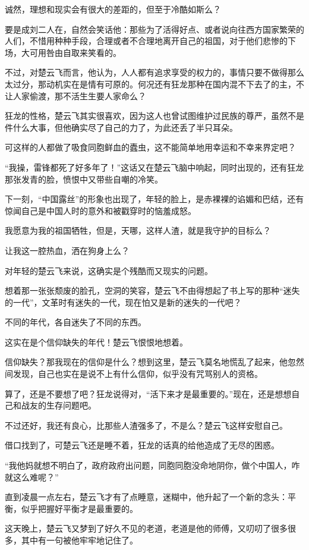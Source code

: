 诚然，理想和现实会有很大的差距的，但至于冷酷如斯么？

要是成刘二人在，自然会笑话他：那些为了活得好点、或者说向往西方国家繁荣的人们，不惜用种种手段，合理或者不合理地离开自己的祖国，对于他们悲惨的下场，大可用咎由自取来笑看的。

不过，对楚云飞而言，他认为，人人都有追求享受的权力的，事情只要不做得那么太过分，那动机实在是情有可原的。何况还有狂龙那种在国内混不下去了的主，不让人家偷渡，那不活生生要人家命么？

狂龙的性格，楚云飞其实很喜欢，因为这人也曾试图维护过民族的尊严，虽然不是件什么大事，但他确实尽了自己的力了，为此还丢了半只耳朵。

可这样的人都做了吸食同胞鲜血的蠹虫，这不能简单地用幸运和不幸来界定吧？

“我操，雷锋都死了好多年了！”这话又在楚云飞脑中响起，同时出现的，还有狂龙那张发青的脸，愤恨中又带些自嘲的冷笑。

下一刻，“中国露丝”的形象也出现了，年轻的脸上，是赤裸裸的谄媚和巴结，还有惊闻自己是中国人时的意外和被戳穿时的恼羞成怒。

我愿意为我的祖国牺牲，但是，天哪，这样人渣，就是我守护的目标么？

让我这一腔热血，洒在狗身上么？

对年轻的楚云飞来说，这确实是个残酷而又现实的问题。

想着那一张张颓废的脸孔，空洞的笑容，楚云飞不由得想起了书上写的那种“迷失的一代”，文革时有迷失的一代，现在怕又是新的迷失的一代吧？

不同的年代，各自迷失了不同的东西。

这实在是个信仰缺失的年代！楚云飞恨恨地想着。

信仰缺失？那我现在的信仰是什么？想到这里，楚云飞莫名地慌乱了起来，他忽然间发现，自己也实在是说不上有什么信仰，似乎没有咒骂别人的资格。

算了，还是不要想了吧？狂龙说得对，“活下来才是最重要的。”现在，还是想想自己和战友的生存问题吧。

不过还好，我还有良心，比那些人渣强多了，不是么？楚云飞这样安慰自己。

借口找到了，可楚云飞还是睡不着，狂龙的话真的给他造成了无尽的困惑。

“我他妈就想不明白了，政府政府出问题，同胞同胞没命地阴你，做个中国人，咋就这么难呢？”

直到凌晨一点左右，楚云飞才有了点睡意，迷糊中，他升起了一个新的念头：平衡，似乎把握好平衡才是最重要的。

这天晚上，楚云飞又梦到了好久不见的老道，老道是他的师傅，又叨叨了很多很多，其中有一句被他牢牢地记住了。

